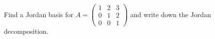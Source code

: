 \documentclass{amsart}
\begin{document}
	
\vspace{2em}

Find a Jordan basis for $A=\begin{pmatrix}
	1&2&3\\0&1&2\\0&0&1
\end{pmatrix}$ and write down the Jordan decomposition.
\end{document}
